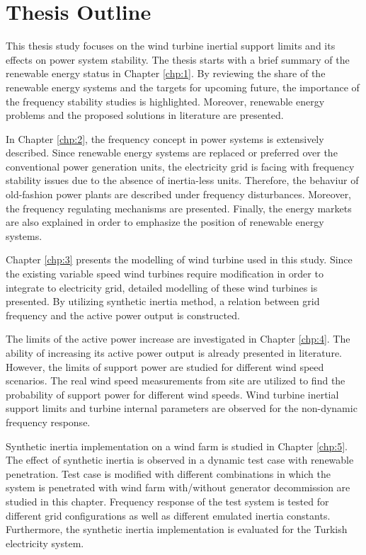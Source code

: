 \section{Thesis Outline}
This thesis study focuses on the wind turbine inertial support limits and its effects on power system stability. The thesis starts with a brief summary of the renewable energy status in Chapter \ref{chp:1}. By reviewing the share of the renewable energy systems and the targets for upcoming future, the importance of the frequency stability studies is highlighted. Moreover, renewable energy problems and the proposed solutions in literature are presented. \par
In Chapter \ref{chp:2}, the frequency concept in power systems is extensively described. Since renewable energy systems are replaced or preferred over the conventional power generation units, the electricity grid is facing with frequency stability issues due to the absence of inertia-less units. Therefore, the behaviur of old-fashion power plants are described under frequency disturbances. Moreover, the frequency regulating mechanisms are presented. Finally, the energy markets are also explained in order to emphasize the position of renewable energy systems.\par
Chapter \ref{chp:3} presents the modelling of wind turbine used in this study. Since the existing variable speed wind turbines require modification in order to integrate to electricity grid, detailed modelling of these wind turbines is presented. By utilizing synthetic inertia method, a relation between grid frequency and the active power output is constructed.\par
The limits of the active power increase are investigated in Chapter \ref{chp:4}. The ability of increasing its active power output is already presented in literature. However, the limits of support power are studied for different wind speed scenarios. The real wind speed measurements from site are utilized to find the probability of support power for different wind speeds. Wind turbine inertial support limits and turbine internal parameters are observed for the non-dynamic frequency response.\par
Synthetic inertia implementation on a wind farm is studied in Chapter \ref{chp:5}. The effect of synthetic inertia is observed in a dynamic test case with renewable penetration. Test case is modified with different combinations in which the system is penetrated with wind farm with/without generator decommission are studied in this chapter. Frequency response of the test system is tested for different grid configurations as well as different emulated inertia constants. Furthermore, the synthetic inertia implementation is evaluated for the Turkish electricity system. \par
